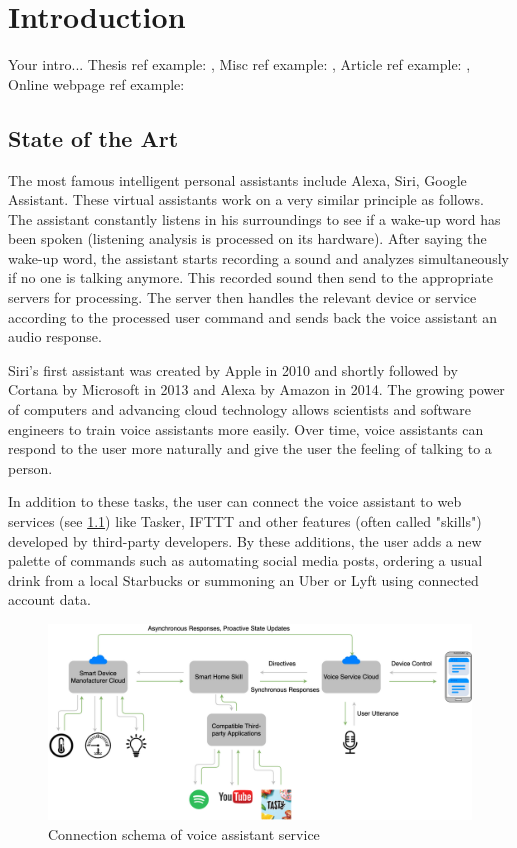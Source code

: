 \chapter{Introduction} \label{chap:introduction}
Your intro... Thesis ref example: \cite{bulin:2016}, Misc ref example: \cite{smidl:pc}, Article ref example: \cite{mcculloch:neuron}, Online webpage ref example: \cite{online:xor_solution}

\section{State of the Art} \label{sec:state_of_the_art}


The most famous intelligent personal assistants include Alexa, Siri, Google Assistant. These virtual assistants work on a very similar principle as follows. The assistant constantly listens in his surroundings to see if a wake-up word has been spoken (listening analysis is processed on its hardware). After saying the wake-up word, the assistant starts recording a sound and analyzes simultaneously if no one is talking anymore. This recorded sound then send to the appropriate servers for processing. The server then handles the relevant device or service according to the processed user command and sends back the voice assistant an audio response.

Siri's first assistant was created by Apple in 2010 and shortly followed by Cortana by Microsoft in 2013 and Alexa by Amazon in 2014. The growing power of computers and advancing cloud technology allows scientists and software engineers to train voice assistants more easily. Over time, voice assistants can respond to the user more naturally and give the user the feeling of talking to a person. 

In addition to these tasks, the user can connect the voice assistant to web services (see \cref{fig:voice_assistant_connecrtion_schema}) like Tasker, IFTTT and other features (often called "skills") developed by third-party developers. By these additions, the user adds a new palette of commands such as automating social media posts, ordering a usual drink from a local Starbucks or summoning an Uber or Lyft using connected account data.

\begin{figure}[H]
    \centering
    \includegraphics[width=\textwidth]{img/voice_assistant_to_server_connection.png}
    \caption{Connection schema of voice assistant service}
    \label{fig:voice_assistant_connecrtion_schema}
\end{figure}

